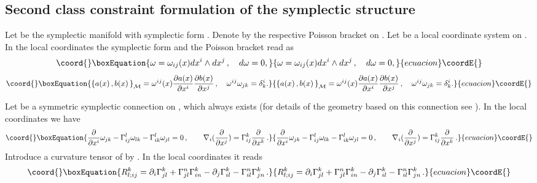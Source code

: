 \documentclass[a4paper,11pt,oneside]{amsart}
\theoremstyle{plain}
\numberwithin{equation}{section} %
\numberwithin{figure}{section} %
\providecommand{\pb}[2]{\left\{{}#1{},{}#2{}\right\}}
\def\d{\partial}
\providecommand{\dl}[1]{\displaystyle\frac{{\d}}{\d #1}}
\def\manM{{\mathcal M}}
\begin{document}
\subsection{Second class constraint formulation of the
symplectic structure}\label{subsec:FM}
Let \myHighlight{$\manM$}\coordHE{} be the symplectic manifold with symplectic form \myHighlight{$\omega$}\coordHE{}.
Denote by \myHighlight{$\pb{\cdot \,}{\cdot \,}_\manM $}\coordHE{} the respective
Poisson bracket on \myHighlight{$\manM$}\coordHE{}.  Let \coordHE{} be a local coordinate
system on \myHighlight{$\manM$}\coordHE{}.  In the local coordinates
the symplectic form and the Poisson bracket read as
\begin{equation}\coord{}\boxEquation{
\omega=\omega_{ij}(x)d x^i\wedge d x^j \,, \quad d \omega =0 ,
\label{formM}
}{
\omega=\omega_{ij}(x)d x^i\wedge d x^j \,, \quad d \omega =0 ,
}{ecuacion}\coordE{}\end{equation}
\begin{equation}\coord{}\boxEquation{
\pb{a(x)\,}{b(x)\,}_\manM=
\omega^{ij}(x)\frac{\d a(x)}{\d x^i}\frac{\d b(x) }{\d x^j}\,,\quad
\omega^{ij}\omega_{jk}=\delta^i_k.
\label{PBM}
}{
\pb{a(x)\,}{b(x)\,}_\manM=
\omega^{ij}(x)\frac{\d a(x)}{\d x^i}\frac{\d b(x) }{\d x^j}\,,\quad
\omega^{ij}\omega_{jk}=\delta^i_k.
}{ecuacion}\coordE{}\end{equation}

\noindent
Let \myHighlight{$\Gamma$}\coordHE{} be a symmetric symplectic connection on \myHighlight{$\manM$}\coordHE{},
which always exists (for details of the geometry based on this
connection see \cite{[GRS]}).
In the local coordinates \coordHE{} we have
\begin{equation}\coord{}\boxEquation{
\label{eq:coefficients}
\dl{x^i}\omega_{jk}-\Gamma^l_{ij}\omega_{lk}-\Gamma^l_{ik}\omega_{jl}=0\,,
\qquad \nabla_i(\dl{x^j})=\Gamma^k_{ij}\dl{x^k}\,.
}{
\dl{x^i}\omega_{jk}-\Gamma^l_{ij}\omega_{lk}-\Gamma^l_{ik}\omega_{jl}=0\,,
\qquad \nabla_i(\dl{x^j})=\Gamma^k_{ij}\dl{x^k}\,.
}{ecuacion}\coordE{}\end{equation}
Introduce a curvature tensor \coordHE{} of \myHighlight{$\Gamma$}\coordHE{} by
\myHighlight{$R^k_{l;ij}\dl{x^k}=[\nabla_i,\nabla_j]\dl{x^l}$}\coordHE{}.
In the local coordinates it reads
\begin{equation}\coord{}\boxEquation{
  \label{eq:riemann}
R^k_{l;ij}=\d_i\Gamma^k_{jl}+\Gamma^n_{jl}\Gamma^k_{in}-
\d_j\Gamma^k_{il}-\Gamma^n_{il}\Gamma^k_{jn}\,.
}{
  R^k_{l;ij}=\d_i\Gamma^k_{jl}+\Gamma^n_{jl}\Gamma^k_{in}-
\d_j\Gamma^k_{il}-\Gamma^n_{il}\Gamma^k_{jn}\,.
}{ecuacion}\coordE{}\end{equation}
\end{document}
